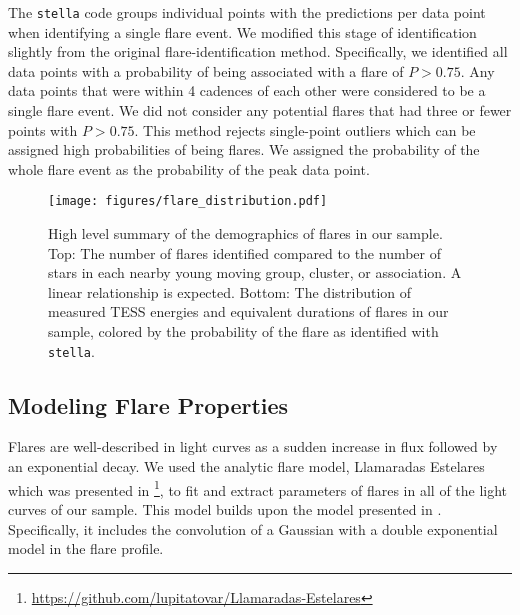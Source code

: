 \documentclass[twocolumn, linenumbers]{aastex631}
\begin{document}
The \texttt{stella} code groups individual points with the predictions per data point
when identifying a single flare event. We modified this stage of identification slightly
from the original flare-identification method. Specifically, we identified all data
points with a probability of being associated with a flare of $P > 0.75$. Any data
points that were within 4 cadences of each other were considered to be a single flare
event. We did not consider any potential flares that had three or fewer points with
$P > 0.75$. This method rejects single-point outliers which can be assigned  high
probabilities of being  flares. We assigned the probability of the whole flare event
as the probability of the peak data point.

\begin{figure}[ht!]
    \begin{centering}
        \texttt{[image: figures/flare\_distribution.pdf]}
        \caption{
            High level summary of the demographics of flares in our sample. Top: The number of flares identified compared to the number of stars in each nearby young moving group, cluster,
            or association. A linear relationship is expected. Bottom: The distribution of measured TESS energies
            and equivalent durations of flares in our sample, colored by the probability of the flare as identified with \texttt{stella}.
        }
        \label{fig:flare_distribution}
    \end{centering}
\end{figure}


\subsection{Modeling Flare Properties}\label{subsec2:model}

Flares are well-described in light curves as a sudden increase in flux followed
by an exponential decay. We used the analytic flare model, Llamaradas Estelares
which was presented in \cite{tovar22}\footnote{\url{https://github.com/lupitatovar/Llamaradas-Estelares}},
to fit and extract parameters of flares in all of the light curves of our sample.
This model builds upon the model presented in \cite{davenport14}. Specifically,
it includes the convolution of a Gaussian with a double exponential model in the
flare profile.
\end{document}
